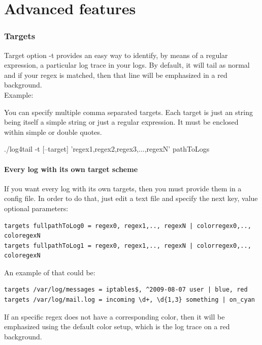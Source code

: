 \part{Advanced features}
\section{Targets}
\label{sec:Targets} Target option -t provides an easy way to identify, by means
of a regular expression, a particular log trace in your logs. By default, it
will tail as normal and if your regex is matched, then that line will be
emphasized in a red background.\\
Example:\\

You can specify multiple comma separated targets. Each target is just an string
being itself a simple string or just a regular expression. It must be enclosed
within simple or double quotes.
\begin{cmd}
 ./log4tail -t [--target] 'regex1,regex2,regex3,...,regexN' pathToLogs
\end{cmd}

\subsection{Every log with its own target scheme}
If you want every log with its own targets, then you must provide them in a
config file.  In order to do that, just edit a text file and specify the next
key, value optional parameters:

\begin{config}
\begin{verbatim}
targets fullpathToLog0 = regex0, regex1,.., regexN | colorregex0,.., coloregexN
targets fullpathToLog1 = regex0, regex1,.., regexN | colorregex0,.., coloregexN
\end{verbatim}
\end{config}

An example of that could be:

\begin{config}
\begin{verbatim}
targets /var/log/messages = iptables$, ^2009-08-07 user | blue, red
targets /var/log/mail.log = incoming \d+, \d{1,3} something | on_cyan
\end{verbatim}
\end{config}

If an specific regex does not have a corresponding color, then it will be
emphasized using the default color setup, which is the log trace on a red
background.

